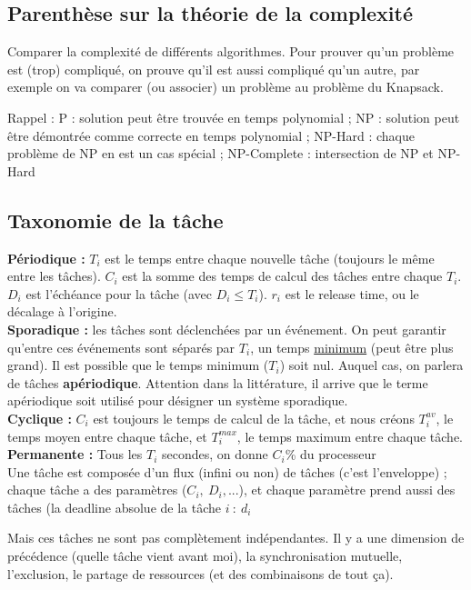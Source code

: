 \documentclass[12pt,a4paper]{article}
\begin{document}
\subsection{Parenthèse sur la théorie de la complexité}
Comparer la complexité de différents algorithmes. Pour prouver qu'un problème est (trop) compliqué, on prouve qu'il est aussi compliqué qu'un autre, par exemple on va comparer (ou associer) un problème au problème du Knapsack. 
\begin{blackbox}
    Rappel : P : solution peut être trouvée en temps polynomial ; NP : solution peut être démontrée comme correcte en temps polynomial ; NP-Hard : chaque problème de NP en est un cas spécial ; NP-Complete : intersection de NP et NP-Hard
\end{blackbox}

\subsection{Taxonomie de la tâche}
\textbf{Périodique :} $T_i$ est le temps entre chaque nouvelle tâche (toujours le même entre les tâches). $C_i$ est la somme des temps de calcul des tâches entre chaque $T_i$. $D_i$ est l'échéance pour la tâche (avec $D_i \leq T_i$). $r_i$ est le release time, ou le décalage à l'origine.\\
\textbf{Sporadique :} les tâches sont déclenchées par un événement. On peut garantir qu'entre ces événements sont séparés par $T_i$, un temps \uline{minimum} (peut être plus grand). Il est possible que le temps minimum ($T_i$) soit nul. Auquel cas, on parlera de tâches \textbf{apériodique}. Attention dans la littérature, il arrive que le terme apériodique soit utilisé pour désigner un système sporadique.\\
\textbf{Cyclique :} $C_i$ est toujours le temps de calcul de la tâche, et nous créons $T_i^{av}$, le temps moyen entre chaque tâche, et $T_i^{max}$, le temps maximum entre chaque tâche.\\
\textbf{Permanente :} Tous les $T_i$ secondes, on donne $C_i$\% du processeur\\

Une tâche est composée d'un flux (infini ou non) de tâches (c'est l'enveloppe) ; chaque tâche a des paramètres ($C_i,\ D_i,...$), et chaque paramètre prend aussi des tâches (la deadline absolue de la tâche $i\ :\ d_i$

Mais ces tâches ne sont pas complètement indépendantes. Il y a une dimension de précédence (quelle tâche vient avant moi), la synchronisation mutuelle, l'exclusion, le partage de ressources (et des combinaisons de tout ça).
\end{document}

